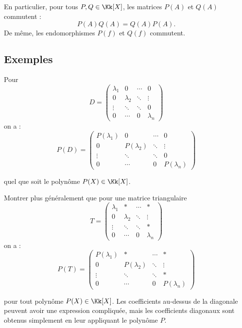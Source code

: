 \documentclass[12pt, class=report,crop=false]{standalone}
\begin{document}
\begin{remarque*}[importante]
En particulier, pour tous $P,Q \in \Kk[X]$, les matrices $P(A)$ et $Q(A)$ commutent :
\[P(A) Q(A) = Q(A)P(A).\]
De même, les endomorphismes $P(f)$ et $Q(f)$ commutent.
\end{remarque*}


\subsection{Exemples}


\begin{exemple}
Pour 
\[D = \begin{pmatrix} 
\lambda_1& 0 & \cdots & 0\\
0 &\lambda_2& \ddots & \vdots\\
\vdots &\ddots& \ddots &0\\
0&\cdots&0& \lambda_n
\end{pmatrix}\]
on a :
\[P(D) = \begin{pmatrix} 
P(\lambda_1)& 0 & \cdots & 0\\
0 &P(\lambda_2)& \ddots & \vdots\\
\vdots &\ddots& \ddots &0\\
0&\cdots&0& P(\lambda_n)
\end{pmatrix}\]

quel que soit le polynôme $P(X) \in \Kk[X]$.
\end{exemple}


\begin{exemple}
Montrer plus généralement que pour une matrice triangulaire
\[T =\begin{pmatrix} 
\lambda_1& * & \cdots & *\\
0 &\lambda_2& \ddots & \vdots\\
\vdots &\ddots& \ddots &*\\
0&\cdots&0& \lambda_n
\end{pmatrix}\]
on a :
\[P(T) = \begin{pmatrix} 
P(\lambda_1)& * & \cdots & *\\
0 &P(\lambda_2)& \ddots & \vdots\\
\vdots &\ddots& \ddots &*\\
0&\cdots&0& P(\lambda_n)
\end{pmatrix}\]

pour tout polynôme $P(X)  \in \Kk[X]$. 
Les coefficients au-dessus de la diagonale peuvent avoir une expression compliquée, mais les coefficients diagonaux sont obtenus simplement en leur appliquant le polynôme $P$.
\end{exemple}
\end{document}
